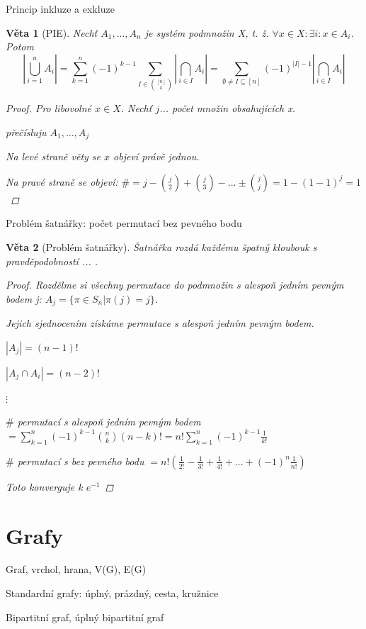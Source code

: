 \documentclass[10pt,a4paper]{article}
\theoremstyle{plain}
\newtheorem{veta}{Věta}
\theoremstyle{definition}
\begin{document}
Princip inkluze a exkluze
\begin{veta}[PIE]
Nechť $A_1, ..., A_n$ je systém podmnožin X, t. ž. $\forall x \in X: \exists i: x \in A_i$. Potom
\[ \left|\bigcup^n_{i=1} A_i	\right| = \sum^n_{k=1} (-1)^{k-1} \sum_{I \in \binom{[n]}{k}} \left| \bigcap_{i \in I} A_i \right| = \sum_{\emptyset \neq I \subseteq [n]} (-1)^{|I|-1} \left| \bigcap_{i \in I} A_i \right| \] 
\begin{proof}
Pro libovolné $x \in X$.
Nechť $j$... počet množin obsahujících x.

přečísluju $A_1, ..., A_j$

Na levé straně věty se $x$ objeví právě jednou.

Na pravé straně se objeví:
$\# = j - \binom{j}{2} + \binom{j}{3} - ... \pm \binom{j}{j} = 1 -(1-1)^j  = 	 1$
\end{proof}
\end{veta}

Problém šatnářky: počet permutací bez pevného bodu
\begin{veta}[Problém šatnářky]
Šatnářka rozdá každému špatný kloubouk s pravděpodobností ... .
\begin{proof}
Rozdělme si všechny permutace do podmnožin s alespoň jedním pevným bodem j: $A_j = \{ \pi \in S_n | \pi(j) = j \}$.

Jejich sjednocením získáme permutace s alespoň jedním pevným bodem.

$|A_j| = (n-1)!$  

$|A_j \cap A_i| = (n-2)!$

$\vdots$

$\#$ permutací s alespoň jedním pevným bodem $= \displaystyle \sum^n_{k=1} (-1)^{k-1} \binom{n}k (n-k)! = n! \sum^n_{k=1} (-1)^{k-1} \frac{1}{k!}$

$\#$ permutací s bez pevného bodu $= n!(\frac{1}{2!}-\frac{1}{3!}+\frac{1}{4!} +  ... + (-1)^n \frac{1}{n!})$

Toto konverguje k $e^{-1}$

\end{proof}
\end{veta}

\section{Grafy}

Graf, vrchol, hrana, V(G), E(G)

Standardní grafy: úplný, prázdný, cesta, kružnice

Bipartitní graf, úplný bipartitní graf
\end{document}
